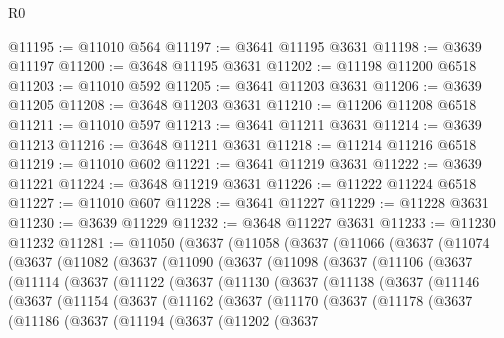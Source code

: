 \begin{lexlean}{R0}
\begin{coremodule}
@11195 := @11010 @564
@11197 := @3641 @11195 @3631
@11198 := @3639 @11197
@11200 := @3648 @11195 @3631
@11202 := @11198 @11200 @6518
@11203 := @11010 @592
@11205 := @3641 @11203 @3631
@11206 := @3639 @11205
@11208 := @3648 @11203 @3631
@11210 := @11206 @11208 @6518
@11211 := @11010 @597
@11213 := @3641 @11211 @3631
@11214 := @3639 @11213
@11216 := @3648 @11211 @3631
@11218 := @11214 @11216 @6518
@11219 := @11010 @602
@11221 := @3641 @11219 @3631
@11222 := @3639 @11221
@11224 := @3648 @11219 @3631
@11226 := @11222 @11224 @6518
@11227 := @11010 @607
@11228 := @3641 @11227
@11229 := @11228 @3631
@11230 := @3639 @11229
@11232 := @3648 @11227 @3631
@11233 := @11230 @11232
@11281 := @11050
    (@3637
      (@11058
        (@3637
          (@11066
            (@3637
              (@11074
                (@3637
                  (@11082
                    (@3637
                      (@11090
                        (@3637
                          (@11098
                            (@3637
                              (@11106
                                (@3637
                                  (@11114
                                    (@3637
                                      (@11122
                                        (@3637
                                          (@11130
                                            (@3637
                                              (@11138
                                                (@3637
                                                  (@11146
                                                    (@3637
                                                      (@11154
                                                        (@3637
                                                          (@11162
                                                            (@3637
                                                              (@11170
                                                                (@3637
                                                                  (@11178
                                                                    (@3637
                                                                      (@11186
                                                                        (@3637
                                                                          (@11194
                                                                            (@3637
                                                                              (@11202
                                                                                (@3637

\end{coremodule}
\end{lexlean}

